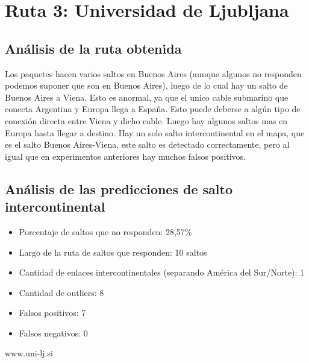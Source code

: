 \section{Ruta 3: Universidad de Ljubljana}

\subsection{Análisis de la ruta obtenida}

Los paquetes hacen varios saltos en Buenos Aires (aunque algunos no responden podemos suponer que son en Buenos Aires), luego de lo cual hay un salto de Buenos Aires a Viena. Esto es anormal, ya que el unico cable submarino que conecta Argentina y Europa llega a España. Esto puede deberse a algún tipo de conexión directa entre Viena y dicho cable. Luego hay algunos saltos mas en Europa hasta llegar a destino. Hay un solo salto intercontinental en el mapa, que es el salto Buenos Aires-Viena, este salto es detectado correctamente, pero al igual que en experimentos anteriores hay muchos falsos positivos.

\subsection{Análisis de las predicciones de salto intercontinental}

\begin{itemize}
	\item Porcentaje de saltos que no responden: 28,57\%
	\item Largo de la ruta de saltos que responden: 10 saltos 
	\item Cantidad de enlaces intercontinentales (separando América del Sur/Norte): 1
	\item Cantidad de outliers: 8
	\item Falsos positivos: 7
	\item Falsos negativos: 0
\end{itemize}

www.uni-lj.si

